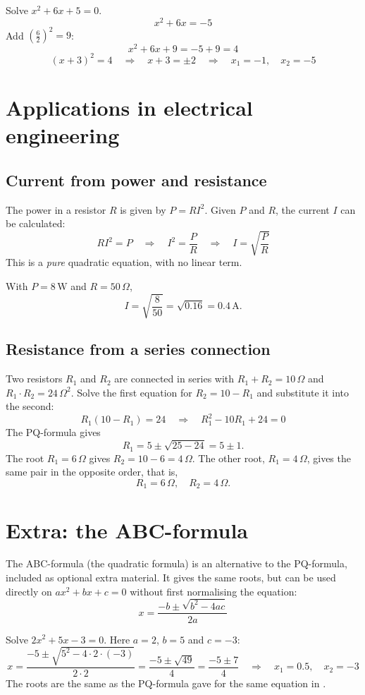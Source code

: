 \begin{exempel}
Solve $x^2 + 6x + 5 = 0$.
\[
  x^2 + 6x = -5
\]
Add $\left(\frac{6}{2}\right)^2 = 9$:
\[
  x^2 + 6x + 9 = -5 + 9 = 4
\]
\[
  (x + 3)^2 = 4 \quad \Rightarrow \quad x + 3 = \pm 2
  \quad \Rightarrow \quad x_1 = -1, \quad x_2 = -5
\]
\end{exempel}

\section{Applications in electrical engineering}
\label{c6:sec:tillampning}

\subsection{Current from power and resistance}
\label{c6:sec:strom}
The power in a resistor $R$ is given by $P = RI^2$. Given $P$ and $R$, the current $I$ can be
calculated:
\[
  RI^2 = P \quad \Rightarrow \quad I^2 = \frac{P}{R} \quad \Rightarrow \quad I = \sqrt{\frac{P}{R}}
\]
This is a \emph{pure} quadratic equation, with no linear term.

\begin{exempel}
With $P = 8\,\text{W}$ and $R = 50\,\Omega$,
\[
  I = \sqrt{\frac{8}{50}} = \sqrt{0.16} = 0.4\,\text{A}.
\]
\end{exempel}

\subsection{Resistance from a series connection}
\label{c6:sec:serie}
Two resistors $R_1$ and $R_2$ are connected in series with $R_1 + R_2 = 10\,\Omega$ and
$R_1 \cdot R_2 = 24\,\Omega^2$. Solve the first equation for $R_2 = 10 - R_1$ and substitute it
into the second:
\[
  R_1(10 - R_1) = 24 \quad \Rightarrow \quad R_1^2 - 10R_1 + 24 = 0
\]
The PQ-formula gives
\[
  R_1 = 5 \pm \sqrt{25 - 24} = 5 \pm 1.
\]
The root $R_1 = 6\,\Omega$ gives $R_2 = 10 - 6 = 4\,\Omega$. The other root, $R_1 = 4\,\Omega$,
gives the same pair in the opposite order, that is,
\[
  R_1 = 6\,\Omega, \quad R_2 = 4\,\Omega.
\]

\section{Extra: the ABC-formula}
\label{c6:sec:abc}
The ABC-formula (the quadratic formula) is an alternative to the PQ-formula, included as optional
extra material. It gives the same roots, but can be used directly on $ax^2 + bx + c = 0$ without
first normalising the equation:
\[
  x = \frac{-b \pm \sqrt{b^2 - 4ac}}{2a}
\]

\begin{exempel}
Solve $2x^2 + 5x - 3 = 0$. Here $a = 2$, $b = 5$ and $c = -3$:
\[
  x = \frac{-5 \pm \sqrt{5^2 - 4 \cdot 2 \cdot (-3)}}{2 \cdot 2} = \frac{-5 \pm \sqrt{49}}{4}
  = \frac{-5 \pm 7}{4} \quad \Rightarrow \quad x_1 = 0.5, \quad x_2 = -3
\]
The roots are the same as the PQ-formula gave for the same equation in .
\end{exempel}
